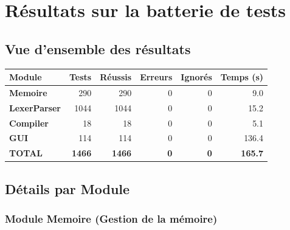 \section{Résultats sur la batterie de tests}

\subsection{Vue d'ensemble des résultats}

\begin{center}
\begin{tabular}{|l|r|r|r|r|r|}
\hline
\rowcolor{headerblue!20}
\textbf{Module} & \textbf{Tests} & \textbf{Réussis} & \textbf{Erreurs} & \textbf{Ignorés} & \textbf{Temps (s)} \\
\hline
\textbf{Memoire} & 290 & \textcolor{successgreen}{290} & \textcolor{successgreen}{0} & 0 & 9.0 \\
\hline
\textbf{LexerParser} & 1044 & \textcolor{successgreen}{1044} & \textcolor{successgreen}{0} & 0 & 15.2 \\
\hline
\textbf{Compiler} & 18 & \textcolor{successgreen}{18} & \textcolor{successgreen}{0} & 0 & 5.1 \\
\hline
\textbf{GUI} & 114 & \textcolor{successgreen}{114} & \textcolor{successgreen}{0} & \textcolor{successgreen}{0} & 136.4 \\
\hline
\rowcolor{gray!10}
\textbf{TOTAL} & \textbf{1466} & \textbf{1466} & \textbf{0} & \textbf{0} & \textbf{165.7} \\
\hline
\end{tabular}
\end{center}

\subsection{Détails par Module}

\subsubsection{Module Memoire (Gestion de la mémoire)}

